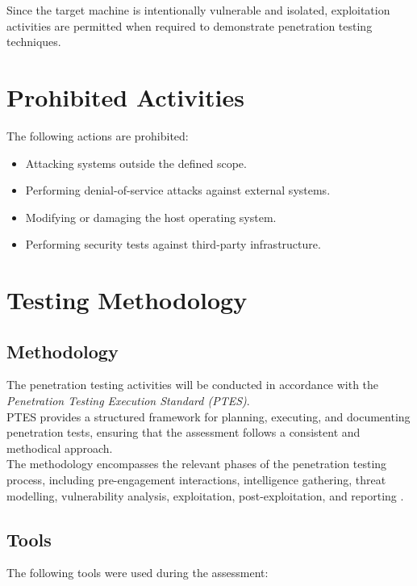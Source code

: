 Since the target machine is intentionally vulnerable and isolated, exploitation activities are permitted when required to demonstrate penetration testing techniques.

\section{Prohibited Activities}
The following actions are prohibited:

\begin{itemize}
    \item Attacking systems outside the defined scope.
    \item Performing denial-of-service attacks against external systems.
    \item Modifying or damaging the host operating system.
    \item Performing security tests against third-party infrastructure.
\end{itemize}

\section{Testing Methodology}
\subsection{Methodology}
The penetration testing activities will be conducted in accordance with the \textit{Penetration Testing Execution Standard (PTES)}. 
\\

PTES provides a structured framework for planning, executing, and documenting penetration tests, ensuring that the assessment follows a consistent and methodical approach. 
\\

The methodology encompasses the relevant phases of the penetration testing process, including pre-engagement interactions, intelligence gathering, threat modelling, vulnerability analysis, exploitation, post-exploitation, and reporting \cite{ptes}. 

\subsection{Tools}
The following tools were used during the assessment:

